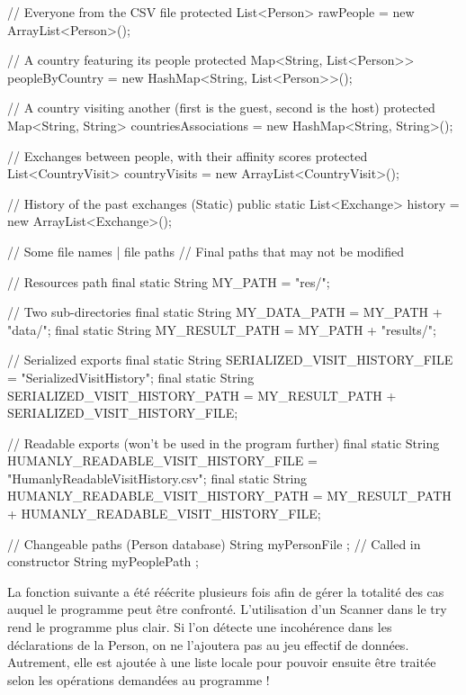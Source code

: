 \documentclass{mytex}
\begin{document}
\begin{codebox}
// Everyone from the CSV file
protected List<Person> rawPeople = new ArrayList<Person>();

// A country featuring its people
protected Map<String, List<Person>> peopleByCountry = new HashMap<String, List<Person>>();

// A country visiting another (first is the guest, second is the host)
protected Map<String, String> countriesAssociations = new HashMap<String, String>(); 

// Exchanges between people, with their affinity scores
protected List<CountryVisit> countryVisits = new ArrayList<CountryVisit>();

// History of the past exchanges (Static)
public static List<Exchange> history = new ArrayList<Exchange>();

// Some file names | file paths
// Final paths that may not be modified

// Resources path
final static String MY_PATH = "res/";

// Two sub-directories
final static String MY_DATA_PATH = MY_PATH + "data/";
final static String MY_RESULT_PATH = MY_PATH + "results/";

// Serialized exports
final static String SERIALIZED_VISIT_HISTORY_FILE = "SerializedVisitHistory";
final static String SERIALIZED_VISIT_HISTORY_PATH = MY_RESULT_PATH + SERIALIZED_VISIT_HISTORY_FILE;

// Readable exports (won't be used in the program further)
final static String HUMANLY_READABLE_VISIT_HISTORY_FILE = "HumanlyReadableVisitHistory.csv";
final static String HUMANLY_READABLE_VISIT_HISTORY_PATH = MY_RESULT_PATH + HUMANLY_READABLE_VISIT_HISTORY_FILE;

// Changeable paths (Person database)
String myPersonFile ; // Called in constructor
String myPeoplePath ;
\end{codebox}


La fonction suivante a été réécrite plusieurs fois afin de gérer la totalité des cas auquel le programme peut être confronté. L'utilisation d'un Scanner dans le try rend le programme plus clair. Si l'on détecte une incohérence dans les déclarations de la Person, on ne l'ajoutera pas au jeu effectif de données. Autrement, elle est ajoutée à une liste locale pour pouvoir ensuite être traitée selon les opérations demandées au programme !
\end{document}
